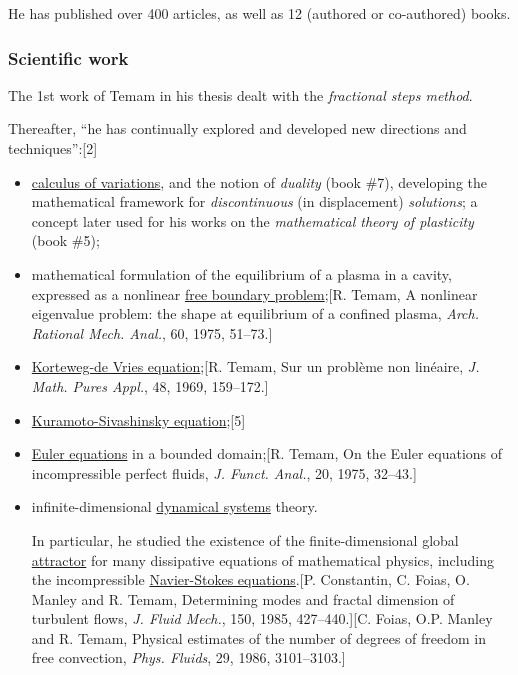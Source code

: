 \documentclass{article}
\begin{document}
He has published over 400 articles, as well as 12 (authored or co-authored) books.

\subsubsection{Scientific work}
The 1st work of Temam in his thesis dealt with the \textit{fractional steps method}.

Thereafter, ``he has continually explored and developed new directions and techniques'':[2]
\begin{itemize}
	\item \href{https://en.wikipedia.org/wiki/Calculus_of_variations}{calculus of variations}, and the notion of \textit{duality} (book \#7), developing the mathematical framework for \textit{discontinuous} (in displacement) \textit{solutions}; a concept later used for his works on the \textit{mathematical theory of plasticity} (book \#5);
	\item mathematical formulation of the equilibrium of a plasma in a cavity, expressed as a nonlinear \href{https://en.wikipedia.org/wiki/Free_boundary_problem}{free boundary problem};[R. Temam, A nonlinear eigenvalue problem: the shape at equilibrium of a confined plasma, \textit{Arch. Rational Mech. Anal.}, 60, 1975, 51--73.]
	\item \href{https://en.wikipedia.org/wiki/Korteweg-de_Vries_equation}{Korteweg-de Vries equation};[R. Temam, Sur un problème non linéaire, \textit{J. Math. Pures Appl.}, 48, 1969, 159--172.]
	\item \href{https://en.wikipedia.org/wiki/Kuramoto%E2%80%93Sivashinsky_equation}{Kuramoto-Sivashinsky equation};[5]
	\item \href{https://en.wikipedia.org/wiki/Euler_equations}{Euler equations} in a bounded domain;[R. Temam, On the Euler equations of incompressible perfect fluids, \textit{J. Funct. Anal.}, 20, 1975, 32--43.]
	\item infinite-dimensional \href{https://en.wikipedia.org/wiki/Dynamical_systems}{dynamical systems} theory.
	
	In particular, he studied the existence of the finite-dimensional global \href{https://en.wikipedia.org/wiki/Attractor}{attractor} for many dissipative equations of mathematical physics, including the incompressible \href{https://en.wikipedia.org/wiki/Navier-Stokes_equations}{Navier-Stokes equations}.[P. Constantin, C. Foias, O. Manley and R. Temam, Determining modes and fractal dimension of turbulent flows, \textit{J. Fluid Mech.}, 150, 1985, 427--440.][C. Foias, O.P. Manley and R. Temam, Physical estimates of the number of degrees of freedom in free convection, \textit{Phys. Fluids}, 29, 1986, 3101--3103.]
	

\end{itemize}
\end{document}
